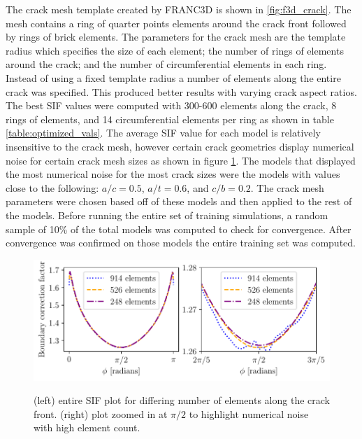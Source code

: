 The crack mesh template created by FRANC3D is shown in \ref{fig:f3d_crack}. The mesh contains a ring of quarter points elements around the crack front followed by rings of brick elements. The parameters for the crack mesh are the template radius which specifies the size of each element; the number of rings of elements around the crack; and the number of circumferential elements in each ring. Instead of using a fixed template radius a number of elements along the entire crack was specified. This produced better results with varying crack aspect ratios. The best SIF values were computed with 300-600 elements along the crack, 8 rings of elements, and 14 circumferential elements per ring as shown in table \ref{table:optimized_vals}. The average SIF value for each model is relatively insensitive to the crack mesh, however certain crack geometries display numerical noise for certain crack mesh sizes as shown in figure \ref{fig:crack_mesh_convergence}. The models that displayed the most numerical noise for the most crack sizes were the models with values close to the following: $a/c = 0.5$, $a/t = 0.6$, and $c/b = 0.2$. The crack mesh parameters were chosen based off of these models and then applied to the rest of the models. Before running the entire set of training simulations, a random sample of 10\% of the total models was computed to check for convergence. After convergence was confirmed on those models the entire training set was computed. 

\begin{figure}
    \centering
    \includegraphics[width=\textwidth]{Figures_pdf/numerical_noise.pdf}
    \label{fig:crack_mesh_convergence}
    \caption{(left) entire SIF plot for differing number of elements along the crack front. (right) plot zoomed in at $\pi/2$ to highlight numerical noise with high element count.}
\end{figure}




